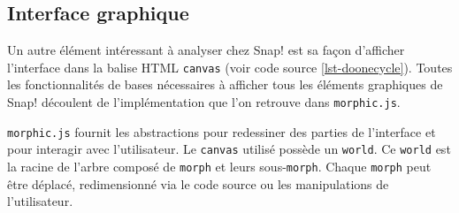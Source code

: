 % 
% 
% 

\subsection{Interface graphique}
Un autre élément intéressant à analyser chez Snap! est sa façon d'afficher l'interface dans la balise HTML \texttt{canvas} (voir code source \ref{lst-doonecycle}). Toutes les fonctionnalités de bases nécessaires à afficher tous les éléments graphiques de Snap! découlent de l'implémentation que l'on retrouve dans \texttt{morphic.js}.

\texttt{morphic.js} fournit les abstractions pour redessiner des parties de l'interface et pour interagir avec l'utilisateur. Le \texttt{canvas} utilisé possède un \texttt{world}. Ce \texttt{world} est la racine de l'arbre composé de \texttt{morph} et leurs sous-\texttt{morph}. Chaque \texttt{morph} peut être déplacé, redimensionné via le code source ou les manipulations de l'utilisateur.

